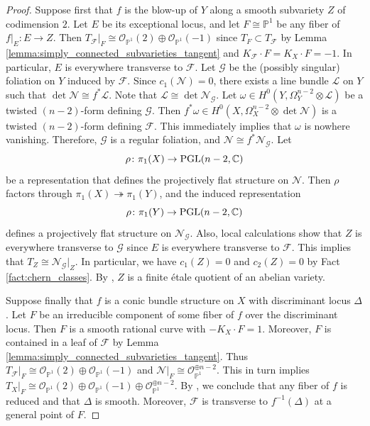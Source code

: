 \documentclass[english,10pt]{amsart}
\newcommand{\cF}{\mathcal{F}}
\newcommand{\cG}{\mathcal{G}}
\newcommand{\sL}{\mathscr{L}}
\newcommand{\sN}{\mathscr{N}}
\newcommand{\sO}{\mathscr{O}}
\theoremstyle{definition}
\theoremstyle{remark}
\numberwithin{equation}{section}
\begin{document}
\begin{proof}
Suppose first that $f$ is the blow-up of $Y$ along a smooth subvariety $Z$ of codimension $2$. Let $E$ be its exceptional locus, and let $F\cong \mathbb{P}^1$ be any fiber of $f|_E \colon E \to Z$. Then $T_\cF|_F\cong \sO_{\mathbb{P}^1}(2)\oplus \sO_{\mathbb{P}^1}(-1)$ since $T_F \subset T_\cF$ by Lemma \ref{lemma:simply_connected_subvarieties_tangent} and $K_\cF \cdot F = K_X \cdot F = -1$. In particular, $E$ is everywhere transverse to $\cF$. Let $\cG$ be the (possibly singular) foliation on $Y$ induced by $\cF$. Since $c_1(\sN)=0$, there exists a line bundle $\sL$ on $Y$ such that $\det \sN \cong f^* \sL$. Note that $\sL \cong \det \sN_\cG $. Let $\omega \in H^0(Y,\Omega_Y^{n-2}\otimes \sL)$ be a twisted $(n-2)$-form defining $\cG$.
Then $f^*\omega \in H^0(X,\Omega_X^{n-2}\otimes \det \sN)$ is a twisted $(n-2)$-form defining $\cF$. This immediately implies that $\omega$ is nowhere vanishing. Therefore, $\cG$ is a regular foliation, and $\sN \cong f^*\sN_\cG$. Let 
\[
\rho \colon \pi_1(X) \to \textup{PGL}(n-2,\mathbb{C})
\]
be a representation that defines the projectively flat structure on $\sN$. Then $\rho$
factors through $\pi_1(X) \twoheadrightarrow \pi_1(Y)$, and the induced representation
\[
\rho \colon \pi_1(Y) \to \textup{PGL}(n-2,\mathbb{C})
\]
defines a projectively flat structure on $\sN_\cG$. Also, local calculations show that $Z$ is everywhere transverse to $\cG$ since $E$ is everywhere transverse to $\cF$. This implies that $T_Z \cong \sN_\cG|_Z$. In particular, we have $c_1(Z)=0$ and $c_2(Z)=0$ by Fact \ref{fact:chern_classes}. By \cite[Chapter IV Corollary 4.15]{kobayashi_diff_geom_vb}, $Z$ is a finite \'etale quotient of an abelian variety.

\medskip

Suppose finally that $f$ is a conic bundle structure on $X$ with discriminant locus $\Delta$. Let $F$ be an irreducible component of some fiber of $f$ over the discriminant locus. Then $F$ is a smooth rational curve with $-K_X \cdot F =1$. Moreover, $F$ is contained in a leaf of $\cF$ by Lemma \ref{lemma:simply_connected_subvarieties_tangent}. Thus $T_\cF|_F\cong \sO_{\mathbb{P}^1}(2)\oplus \sO_{\mathbb{P}^1}(-1)$ and $\sN|_F \cong \sO_{\mathbb{P}^1}^{\oplus n -2}$. This in turn implies 
$T_X|_F\cong \sO_{\mathbb{P}^1}(2)\oplus \sO_{\mathbb{P}^1}(-1)\oplus \sO_{\mathbb{P}^1}^{\oplus n -2}$. 
By \cite[Lemma 4.7]{druel_bbcd2}, we conclude that any fiber of $f$ is reduced and that $\Delta$ is smooth.
Moreover, $\cF$ is transverse to $f^{-1}(\Delta)$ at a general point of $F$.


\end{proof}
\end{document}
